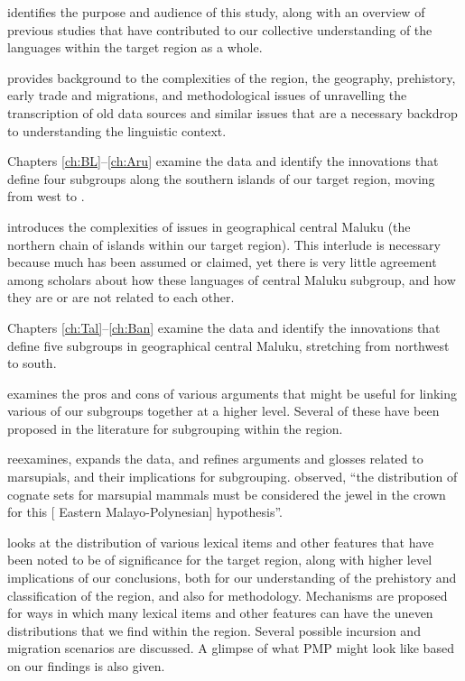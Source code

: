  identifies the purpose
and audience of this study,
along with an overview of previous studies that have contributed to our collective understanding of the languages within the target region as a whole.

 provides background to the complexities of the region,
the geography, prehistory, early trade
and migrations, and methodological issues of unravelling the transcription of old data sources
and similar issues that are a necessary backdrop to understanding the linguistic context.

Chapters \ref{ch:BL}--\ref{ch:Aru} examine the data
and identify the innovations that define four subgroups along the southern islands of our target region,
moving from west to .

 introduces the complexities of issues in geographical central Maluku (the northern chain of islands within our target region).
This interlude is necessary because much has been assumed or claimed,
yet there is very little agreement among scholars about how these languages of central Maluku subgroup,
and how they are or are not related to each other.

Chapters \ref{ch:Tal}--\ref{ch:Ban} examine the data
and identify the innovations that define five subgroups in geographical central Maluku,
stretching from northwest to south.

 examines the pros
and cons of various arguments that might be useful for linking various of our subgroups together at a higher level.
Several of these have been proposed in the literature for subgrouping within the region.

 reexamines,
expands the data,
and refines arguments
and glosses related to marsupials,
and their implications for subgrouping.
\citet[727]{Blust2013} observed,
“the distribution of cognate sets for marsupial mammals must be considered the
jewel in the crown for this [ Eastern Malayo-Polynesian] hypothesis”.

 looks at the distribution of various lexical items
and other features that have been noted to be of significance for the target region,
along with higher level implications of our conclusions,
both for our understanding of the prehistory
and classification of the region,
and also for methodology.
Mechanisms are proposed for ways in which many lexical items
and other features can have the uneven distributions that we find within the region.
Several possible incursion
and migration scenarios are discussed.
A glimpse of what PMP might look like based on our findings is also given.

